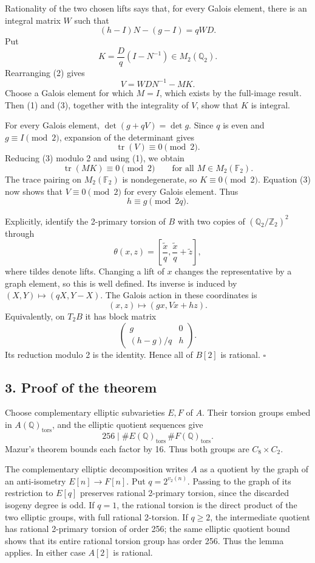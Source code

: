 \documentclass[
  11pt,
]{article}
\begin{document}
Rationality of the two chosen lifts says that, for every Galois element,
there is an integral matrix \(W\) such that \[
(h-I)N-(g-I)=qWD.                                       \tag{2}
\] Put \[
K=\frac Dq(I-N^{-1})\in M_2(\mathbb Q_2).
\] Rearranging (2) gives \[
V=WDN^{-1}-MK.                                         \tag{3}
\] Choose a Galois element for which \(M=I\), which exists by the
full-image result. Then (1) and (3), together with the integrality of
\(V\), show that \(K\) is integral.

For every Galois element, \(\det(g+qV)=\det g\). Since \(q\) is even and
\(g\equiv I\pmod2\), expansion of the determinant gives \[
\operatorname{tr}(V)\equiv0\pmod2.
\] Reducing (3) modulo 2 and using (1), we obtain \[
\operatorname{tr}(MK)\equiv0\pmod2
\qquad\text{for all }M\in M_2(\mathbb F_2).
\] The trace pairing on \(M_2(\mathbb F_2)\) is nondegenerate, so
\(K\equiv0\pmod2\). Equation (3) now shows that \(V\equiv0\pmod2\) for
every Galois element. Thus \[
h\equiv g\pmod{2q}.
\]

Explicitly, identify the 2-primary torsion of \(B\) with two copies of
\((\mathbb Q_2/\mathbb Z_2)^2\) through \[
\theta(x,z)=\left[\frac{\widetilde x}{q},
                         \frac{\widetilde x}{q}+\widetilde z\right],
\] where tildes denote lifts. Changing a lift of \(x\) changes the
representative by a graph element, so this is well defined. Its inverse
is induced by \((X,Y)\mapsto(qX,Y-X)\). The Galois action in these
coordinates is \[
(x,z)\longmapsto(gx,Vx+hz).
\] Equivalently, on \(T_2B\) it has block matrix \[
\begin{pmatrix}g&0\\(h-g)/q&h\end{pmatrix}.
\] Its reduction modulo 2 is the identity. Hence all of \(B[2]\) is
rational. \(\square\)

\subsection{3. Proof of the theorem}\label{proof-of-the-theorem}

Choose complementary elliptic subvarieties \(E,F\) of \(A\). Their
torsion groups embed in \(A(\mathbb Q)_{\mathrm{tors}}\), and the
elliptic quotient sequences give \[
256\mid\#E(\mathbb Q)_{\mathrm{tors}}\,
          \#F(\mathbb Q)_{\mathrm{tors}}.
\] Mazur's theorem bounds each factor by 16. Thus both groups are
\(C_8\times C_2\).

The complementary elliptic decomposition writes \(A\) as a quotient by
the graph of an anti-isometry \(E[n]\to F[n]\). Put \(q=2^{v_2(n)}\).
Passing to the graph of its restriction to \(E[q]\) preserves rational
2-primary torsion, since the discarded isogeny degree is odd. If
\(q=1\), the rational torsion is the direct product of the two elliptic
groups, with full rational 2-torsion. If \(q\ge2\), the intermediate
quotient has rational 2-primary torsion of order 256; the same elliptic
quotient bound shows that its entire rational torsion group has order
256. Thus the lemma applies. In either case \(A[2]\) is rational.
\end{document}
